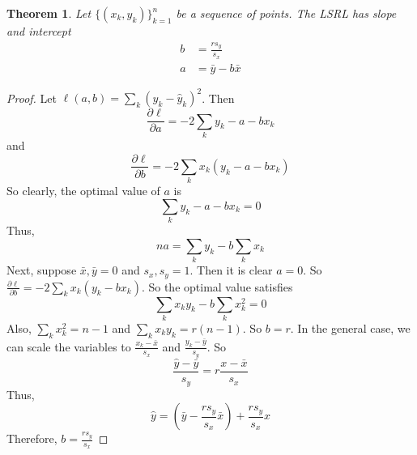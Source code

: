 \documentclass{article}
\newtheorem{theorem}{Theorem}
\theoremstyle{definition}\newtheorem{definition}{DEF}
\theoremstyle{definition}\newtheorem{example}{Ex}
\theoremstyle{lemma}\newtheorem{lemma}{Lemma}
\theoremstyle{corrolary}\newtheorem{corrolary}{Cor}
\begin{document}
\begin{theorem}
Let $\{(x_k, y_k)\}_{k=1}^n$ be a sequence of points.
The LSRL has slope and intercept
\begin{align*}
b &= \frac{rs_y}{s_x} \\
a &= \bar{y} - b\bar{x}
\end{align*}
\end{theorem}
\begin{proof}
Let $\ell (a, b) = \sum_k (y_k - \hat{y}_k)^2$.
Then
\begin{equation*}
\frac{\partial \ell}{\partial a} = -2 \sum_k y_k - a - bx_k
\end{equation*}
and
\begin{equation*}
\frac{\partial \ell}{\partial b} = -2 \sum_k x_k (y_k - a - b x_k)
\end{equation*}
So clearly, the optimal value of $a$ is
\begin{equation*}
\sum_k y_k - a - bx_k = 0
\end{equation*}
Thus,
\begin{equation*}
na = \sum_k y_k - b \sum_k x_k
\end{equation*}
Next, suppose $\bar{x}, \bar{y}=0$ and $s_x, s_y = 1$.
Then it is clear $a=0$.
So $\frac{\partial \ell}{\partial b} = -2 \sum_k x_k (y_k - bx_k)$.
So the optimal value satisfies
\begin{equation*}
\sum_k x_k y_k - b \sum_k x_k^2 = 0
\end{equation*}
Also, $\sum_k x_k^2=n-1$ and $\sum_k x_k y_k = r(n-1)$.
So $b=r$.
In the general case, we can scale the variables to $\frac{x_k - \bar{x}}{s_x}$ and $\frac{y_k - \bar{y}}{s_y}$.
So
\begin{equation*}
\frac{\hat{y} - \bar{y}}{s_y} = r \frac{x - \bar{x}}{s_x}
\end{equation*}
Thus,
\begin{equation*}
\hat{y} = \left( \bar{y} - \frac{rs_y}{s_x} \bar{x} \right) + \frac{rs_y}{s_x} x
\end{equation*}
Therefore, $b=\frac{rs_y}{s_x}$
\end{proof}
\end{document}
